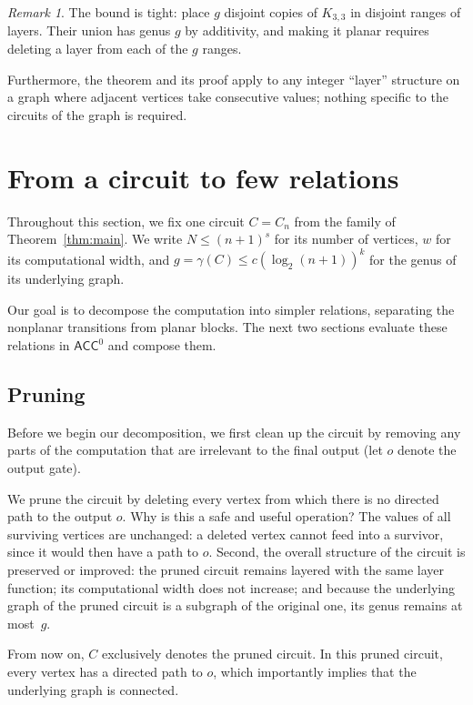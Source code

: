 \documentclass[11pt]{article}
\theoremstyle{definition}
\theoremstyle{remark}
\newtheorem{remark}[theorem]{Remark}
\newcommand{\ACC}{\mathsf{ACC}^0}
\newcommand{\genus}{\gamma}
\begin{document}
\begin{remark}
The bound is tight: place $g$ disjoint copies of $K_{3,3}$ in disjoint ranges of
layers.  Their union has genus $g$ by additivity, and making it planar requires
deleting a layer from each of the $g$ ranges.

Furthermore, the theorem and its proof apply to any integer ``layer'' structure on a graph where adjacent vertices take consecutive values; nothing specific to the circuits of the graph is required.
\end{remark}

\section{From a circuit to few relations}\label{sec:cutting}

Throughout this section, we fix one circuit $C=C_n$ from the family of Theorem~\ref{thm:main}. We write $N\le (n+1)^s$ for its number of vertices, $w$ for its computational width, and $g=\genus(C)\le c(\log_2(n+1))^k$ for the genus of its underlying graph.

Our goal is to decompose the computation into simpler relations, separating the
nonplanar transitions from planar blocks.  The next two sections evaluate these
relations in $\ACC$ and compose them.

\subsection{Pruning}\label{sec:pruning}

Before we begin our decomposition, we first clean up the circuit by removing any parts of the computation that are irrelevant to the final output (let $o$ denote the output gate).

We prune the circuit by deleting every vertex from which there is no directed path to the output $o$. Why is this a safe and useful operation?
The values of all surviving vertices are unchanged: a deleted vertex cannot feed
into a survivor, since it would then have a path to $o$.
Second, the overall structure of the circuit is preserved or improved: the pruned circuit remains layered with the same layer function; its computational width does not increase; and because the underlying graph of the pruned circuit is a subgraph of the original one, its genus remains at most~$g$.

From now on, $C$ exclusively denotes the pruned circuit. In this pruned circuit, every vertex has a directed path to $o$, which importantly implies that the underlying graph is connected.
\end{document}
